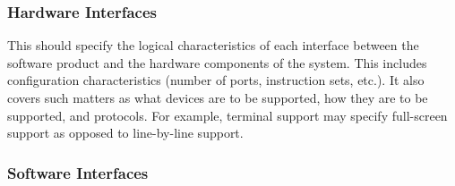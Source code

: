 \documentclass[draftclsnofoot,onecolumn,10pt]{IEEEtran}
\begin{document}
\subsubsection{Hardware Interfaces} %

This should specify the logical characteristics of each interface between the
software product and the hardware components of the system. This includes
configuration characteristics (number of ports, instruction sets, etc.). It also
covers such matters as what devices are to be supported, how they are to be
supported, and protocols. For example, terminal support may specify full-screen
support as opposed to line-by-line support.


\subsubsection{Software Interfaces} %
%
%
%
\end{document}
